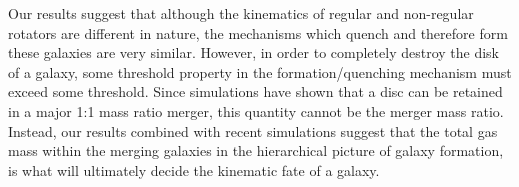 \documentclass[useAMS,usenatbib]{mn2e}
\begin{document}
Our results suggest that although the kinematics of regular and non-regular rotators are different in nature, the mechanisms which quench and therefore form these galaxies are very similar. However, in order to completely destroy the disk of a galaxy, some threshold property in the formation/quenching mechanism must exceed some threshold. Since simulations have shown that a disc can be retained in a major 1:1 mass ratio merger, this quantity cannot be the merger mass ratio. Instead, our results combined with recent simulations suggest that the total gas mass within the merging galaxies in the hierarchical picture of galaxy formation, is what will ultimately decide the kinematic fate of a galaxy. 


  
\end{document}
